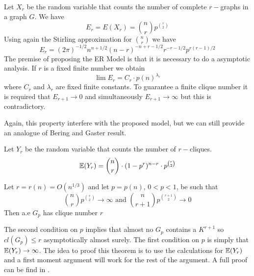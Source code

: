 



Let $X_r$ be the random variable that counts the number of complete $r-$graphs in a graph $G$. We have
$$E_{r} = E(X_r) = \binom{n}{r}p^{\binom{r}{2}}$$
Using again the Stirling approximation for $\binom{n}{r}$ we have
$$E_{r} = (2\pi)^{- 1/2} n^{n+ 1/2} (n - r)^{-n+r-1/2} r^{-r-1/2} p^{r(r- 1)/2}$$
The premise of proposing the ER Model is that it is necessary to do a asymptotic analysis. If $r$ is a fixed finite number we obtain
$$\lim E_{r} = C_{r} \cdot p(n)^{\lambda_{r}}$$
where $C_{r}$ and $\lambda_{r}$ are fixed finite constants. To guarantee a finite clique number it is required that $E_{r+1} \to 0$ and simultaneously $E_{r+1} \to \infty$ but this is contradictory.

Again, this property interfere with the proposed model, but we can still provide an analogue of Bering and Gaster result.

Let $Y_{r}$ be the random variable that counts the number of $r-$cliques.
$$\mathbb{E}(Y_{r}) = \binom{n}{r} \cdot (1-p^{r})^{n-r} \cdot p^{\binom{r}{2}}  $$

\begin{theorem}
Let $r = r(n) = O(n^{1/3})$ and let $p=p(n)$, $0<p<1$, be such that
$$\binom{n}{r} p^{\binom{r}{2}} \to \infty \text{ and } \binom{n}{r+1} p^{\binom{r+1}{2}} \to 0 $$
Then a.e $G_{p}$ has clique number $r$
\end{theorem}
The second condition on $p$ implies that almost no $G_{p}$ contains a $K^{r+1}$ so $cl(G_{p})\leq r$ asymptotically almost surely. The first condition on $p$ is simply that $\mathbb{E} (Y_{r}) \to  \infty$. The idea to proof this theorem is to use the calculations for $\mathbb{E}(Y_{r})$ and a first moment argument will work for the rest of the argument. A full proof can be find in \cite[Bollobás, p.290]{Bollobas}.


